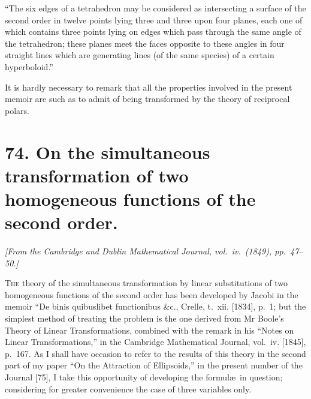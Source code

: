 \documentclass[11pt,a4paper]{article}
\theoremstyle{definition}
\begin{document}
``The six edges of a tetrahedron may be considered as intersecting a surface of the second order in twelve points lying three and three upon four planes, each one of which contains three points lying on edges which pass through the same angle of the tetrahedron; these planes meet the faces opposite to these angles in four straight lines which are generating lines (of the same species) of a certain hyperboloid.''

It is hardly necessary to remark that all the properties involved in the present memoir are such as to admit of being transformed by the theory of reciprocal polars.



\newpage
\section*{74. On the simultaneous transformation of two homogeneous functions of the second order.}

\begin{flushright}
\textit{[From the Cambridge and Dublin Mathematical Journal, vol.\ iv.\ (1849), pp.\ 47--50.]}
\end{flushright}

\setcounter{page}{428}

\textsc{The} theory of the simultaneous transformation by linear substitutions of two homogeneous functions of the second order has been developed by Jacobi in the memoir ``De binis quibuslibet functionibus \&c., Crelle, t.~xii. [1834], p.~1; but the simplest method of treating the problem is the one derived from Mr Boole's Theory of Linear Transformations, combined with the remark in his ``Notes on Linear Transformations,'' in the Cambridge Mathematical Journal, vol.~iv. [1845], p.~167. As I shall have occasion to refer to the results of this theory in the second part of my paper ``On the Attraction of Ellipsoids,'' in the present number of the Journal [75], I take this opportunity of developing the formul\ae\ in question; considering for greater convenience the case of three variables only.
\end{document}
